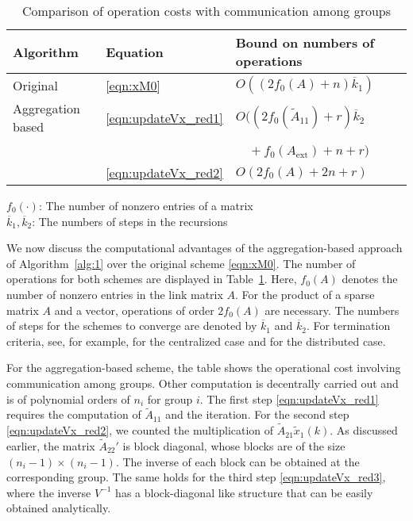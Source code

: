 \documentclass[11pt,draftcls,onecolumn]{IEEEtran}
\begin{document}
\begin{table}[t]
\begin{center}
\caption{Comparison of operation costs with communication among groups}
\label{table:operation}
\begin{tabular}{lll}
  \hline
   Algorithm & Equation & Bound on numbers of operations\\
  \hline Original & \eqref{eqn:xM0} 
    & $O((2 f_{0}(A)+n)\overline{k}_1)$\\
  Aggregation based & \eqref{eqn:updateVx_red1}
    & $O((2f_{0}(\widetilde{A}_{11})+r)\overline{k}_2$\\
    & &  \hspace*{1.1cm}~~$\mbox{} + f_{0}(A_{\text{ext}}) + n + r)$\\
                    & \eqref{eqn:updateVx_red2}
    & $O(2 f_{0}(A)+2n+r)$\\
  \hline
\end{tabular}
\end{center}
\hspace*{6cm} 
$f_0(\cdot)$: The number of nonzero entries of a matrix\\[.5mm]
\hspace*{6cm} 
$\overline{k}_1,\overline{k}_2$: The numbers of steps in the recursions
\end{table}

We now discuss the computational advantages of 
the aggregation-based approach of Algorithm~\ref{alg:1} over
the original scheme \eqref{eqn:xM0}. 
The number of operations for both schemes are displayed in 
Table~\ref{table:operation}.
Here, $f_{0}(A)$ denotes the number of nonzero entries
in the link matrix $A$. For the product of a sparse matrix $A$ and
a vector, operations of order $2f_{0}(A)$ are necessary.
The numbers of steps for the schemes to converge are denoted by
$\overline{k}_1$ and $\overline{k}_2$.
For termination criteria, see, for example, \cite{KamHavGol:04} for the centralized case 
and \cite{IshTem:10} for the distributed case. 

For the aggregation-based scheme, the table shows the operational cost
involving communication among groups. Other computation is decentrally 
carried out and is of polynomial orders of $n_i$ for group $i$.
The first step \eqref{eqn:updateVx_red1}
requires the computation of $\widetilde{A}_{11}$ and the iteration. 
For the second step \eqref{eqn:updateVx_red2}, 
we counted the multiplication of $\widetilde{A}_{21}\widetilde{x}_{1}(k)$.
As discussed earlier, 
the matrix $\widetilde{A}_{22}'$ is block diagonal, whose blocks
are of the size $(n_i-1)\times(n_i-1)$. The inverse of each block
can be obtained at the corresponding group. 
The same holds for the third step \eqref{eqn:updateVx_red3},
where the inverse $V^{-1}$ has a block-diagonal like structure
that can be easily obtained analytically.
\end{document}
